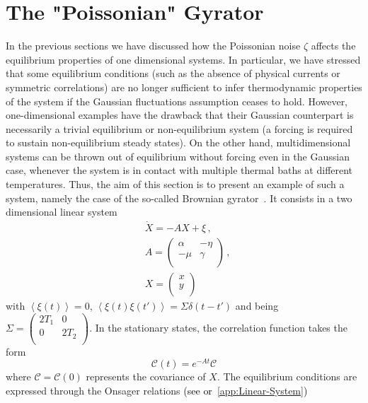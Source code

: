 \documentclass[12pt]{iopart}
\newcommand{\lx} {\left}
\newcommand{\rx} {\right}
\newcommand{\ave}[1] {\lx\langle #1 \rx\rangle}
\newcommand{\cC} {\mathcal{C}}
\begin{document}
\section{The "Poissonian" Gyrator}
\label{sec:bg}
In the previous sections we have discussed how the Poissonian noise $\zeta$ affects the equilibrium properties of one dimensional systems. In particular, we have stressed that some equilibrium conditions (such as the absence of physical currents or symmetric correlations) are no longer sufficient to infer thermodynamic properties of the system if the Gaussian fluctuations assumption ceases to hold. However, one-dimensional examples have the drawback that their Gaussian counterpart is necessarily a trivial equilibrium or non-equilibrium system (a forcing is required to sustain non-equilibrium steady states). On the other hand, multidimensional systems can be thrown out of equilibrium without forcing even in the Gaussian case, whenever the system is in contact with multiple thermal baths at different temperatures. Thus, the aim of this section is to present an example of such a system, namely the case of the so-called Brownian gyrator~\textcolor{black}{\cite{filliger2007brownian,ciliberto2013heat,ciliberto2013statistical,argun2017experimental}}. It consists in a two dimensional linear system
\begin{align}
    &\dot{X}=-AX+\xi\,,\\
    &A=\left(\begin{array}{cc}
    \alpha & -\eta \\
    -\mu & \gamma \\
    \end{array}\right)\,,\nonumber\\
    &X=\left(\begin{array}{c}
    x \\
    y \\
    \end{array}\right)
\end{align}
with $\ave{\xi(t)}=0$, $\ave{\xi(t)\xi(t')}=\Sigma\delta(t-t')$ and being $\Sigma=\left(\begin{array}{cc}
    2T_1 & 0 \\
    0 & 2T_2 \\
    \end{array}\right)$. 
In the stationary states, the correlation function takes the form 
\begin{equation}
    \cC(t)=e^{-At}\cC
    \label{eq:correlation_bg}
\end{equation}
where $\cC=\cC(0)$ represents the covariance of $X$. The equilibrium conditions are expressed through the Onsager relations \textcolor{black}{(see \cite{G90,crisanti2012nonequilibrium,lucente2022inference} or~\ref{app:Linear-System})}
\end{document}
